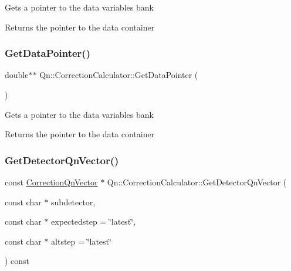 Gets a pointer to the data variables bank \begin{DoxyReturn}{Returns}
the pointer to the data container 
\end{DoxyReturn}
\mbox{\label{classQn_1_1CorrectionCalculator_a9234784d26c9658bf2da7052f7652ebb}} 
\subsubsection{\texorpdfstring{Get\+Data\+Pointer()}{GetDataPointer()}}
{\footnotesize\ttfamily double$\ast$$\ast$ Qn\+::\+Correction\+Calculator\+::\+Get\+Data\+Pointer (\begin{DoxyParamCaption}{ }\end{DoxyParamCaption})\hspace{0.3cm}{\ttfamily [inline]}}

Gets a pointer to the data variables bank \begin{DoxyReturn}{Returns}
the pointer to the data container 
\end{DoxyReturn}
\mbox{\label{classQn_1_1CorrectionCalculator_acc68a2a755636f395fe0baaff56e19d9}} 
\subsubsection{\texorpdfstring{Get\+Detector\+Qn\+Vector()}{GetDetectorQnVector()}}
{\footnotesize\ttfamily const \mbox{\hyperlink{classQn_1_1CorrectionQnVector}{Correction\+Qn\+Vector}} $\ast$ Qn\+::\+Correction\+Calculator\+::\+Get\+Detector\+Qn\+Vector (\begin{DoxyParamCaption}\item[{const char $\ast$}]{subdetector,  }\item[{const char $\ast$}]{expectedstep = {\ttfamily \char`\"{}latest\char`\"{}},  }\item[{const char $\ast$}]{altstep = {\ttfamily \char`\"{}latest\char`\"{}} }\end{DoxyParamCaption}) const}

